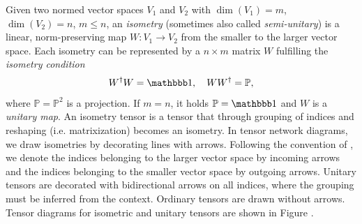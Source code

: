 Given two normed vector spaces $V_1$ and $V_2$ with $\dim\left(V_1\right) = m$, $\dim\left(V_2\right) = n$, $m \le n$, an \textit{isometry} (sometimes also called \textit{semi-unitary}) is a linear, norm-preserving map $W: V_1 \rightarrow V_2$ from the smaller to the larger vector space. Each isometry can be represented by a $n\times m$ matrix $W$ fulfilling the \textit{isometry condition}
\begin{equation}
	\label{eq:isometry_condition_general}
	W^\dagger W = \id, \quad WW^\dagger = \mathbb{P},
\end{equation}
where $\mathbb{P} = \mathbb{P}^2$ is a projection. If $m = n$, it holds $\mathbb{P} = \id$ and $W$ is a \textit{unitary map}. An isometry tensor is a tensor that through grouping of indices and reshaping (i.e. matrixization) becomes an isometry. In tensor network diagrams, we draw isometries by decorating lines with arrows. Following the convention of \cite{cite:isometric_tensor_network_states_in_two_dimensions, cite:efficient_simulation_of_dynamics_in_two_dimensional_quantum_spin_systems}, we denote the indices belonging to the larger vector space by incoming arrows and the indices belonging to the smaller vector space by outgoing arrows. Unitary tensors are decorated with bidirectional arrows on all indices, where the grouping must be inferred from the context. Ordinary tensors are drawn without arrows. Tensor diagrams for isometric and unitary tensors are shown in Figure .\par
